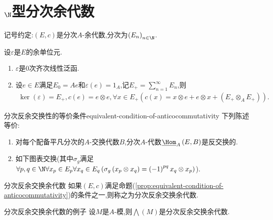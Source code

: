 \section{\texorpdfstring{$\N$}{N}型分次余代数}

记号约定:$\left(E,c\right)$是分次$A$-余代数,分次为$\left(E_{n}\right)_{n\in\N}$.

\begin{proposition}{}{}
	设$\varepsilon$是$E$的余单位元.
	\begin{enumerate}
		\item $\varepsilon$是$0$次齐次线性泛函.
		\item 设$e\in E$满足$E_{0}=Ae$和$\varepsilon\left(e\right)=1_{A}$,记$E_{+}=\sum\limits_{n=1}^{\infty}E_{n}$,则
		\begin{align*}
			\ker\left(\varepsilon\right)=E_{+},c\left(e\right)=e\otimes e,\forall x\in E_{+}\left(c\left(x\right)=x\otimes e+e\otimes x+\left(E_{+}\otimes_{A}E_{+}\right)\right).
		\end{align*}
	\end{enumerate}
\end{proposition}

\begin{proposition}{分次反余交换性的等价条件}{equivalent-condition-of-anticocommutativity}
	下列陈述等价:
	\begin{enumerate}
		\item 对每个配备平凡分次的$A$-交换代数$B$,分次$A$-代数$\underline{\Hom}_{A}\left(E,B\right)$是反交换的.
		\item 如下图表交换(其中$\sigma_{g}$满足$\forall p,q\in\N\forall x_{p}\in E_{p}\forall x_{q}\in E_{q}\left(\sigma_{g}\left(x_{p}\otimes x_{q}\right)=\left(-1\right)^{pq}x_{q}\otimes x_{p}\right)$).
		\begin{center}
		\end{center}
	\end{enumerate}
\end{proposition}

\begin{definition}{分次反余交换余代数}{}
	如果$\left(E,c\right)$满足命题(\cref{prop:equivalent-condition-of-anticocommutativity})的条件之一,则称之为分次反余交换余代数.
\end{definition}

\begin{example}{分次反余交换余代数的例子}{}
	设$M$是$A$-模,则$\bigwedge\left(M\right)$是分次反余交换余代数.
\end{example}
